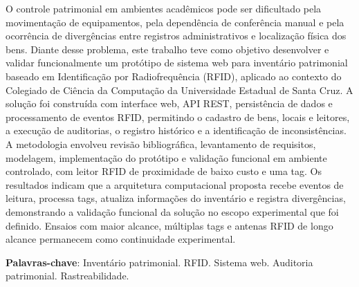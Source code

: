 
\setlength{\absparsep}{18pt} %
\begin{resumo}
O controle patrimonial em ambientes acadêmicos pode ser dificultado pela movimentação de equipamentos, pela dependência de conferência manual e pela ocorrência de divergências entre registros administrativos e localização física dos bens. Diante desse problema, este trabalho teve como objetivo desenvolver e validar funcionalmente um protótipo de sistema web para inventário patrimonial baseado em Identificação por Radiofrequência (RFID), aplicado ao contexto do Colegiado de Ciência da Computação da Universidade Estadual de Santa Cruz. A solução foi construída com interface web, API REST, persistência de dados e processamento de eventos RFID, permitindo o cadastro de bens, locais e leitores, a execução de auditorias, o registro histórico e a identificação de inconsistências. A metodologia envolveu revisão bibliográfica, levantamento de requisitos, modelagem, implementação do protótipo e validação funcional em ambiente controlado, com leitor RFID de proximidade de baixo custo e uma tag. Os resultados indicam que a arquitetura computacional proposta recebe eventos de leitura, processa tags, atualiza informações do inventário e registra divergências, demonstrando a validação funcional da solução no escopo experimental que foi definido. Ensaios com maior alcance, múltiplas tags e antenas RFID de longo alcance permanecem como continuidade experimental.

 \textbf{Palavras-chave}: Inventário patrimonial. RFID. Sistema web. Auditoria patrimonial. Rastreabilidade.
\end{resumo}

